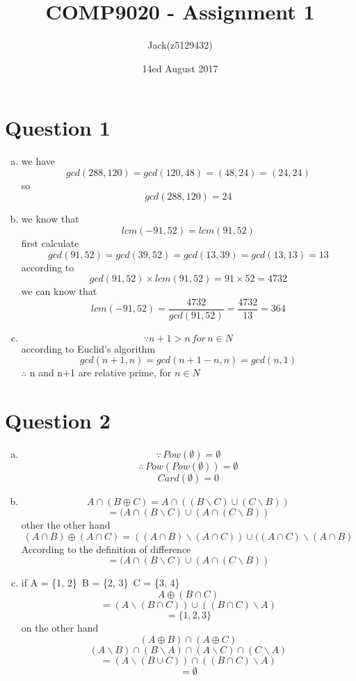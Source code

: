 \documentclass[11pt, a4paper]{article}
\begin{document}
\title{COMP9020 - Assignment 1}
\author{Jack(z5129432)}
\date{ 14ed August 2017 }
\maketitle


\section*{Question 1}
\begin{enumerate}[(a)]
	\item
	we have $$gcd(288, 120) = gcd(120, 48) = (48, 24) = (24, 24)$$
	so $$gcd(288, 120) = 24$$
	\item
	we know that $$lcm(-91, 52) = lcm(91, 52)$$
	first calculate $$gcd(91, 52) = gcd(39, 52) = gcd(13, 39) = gcd(13, 13) = 13$$
	according to \cite{lcm} $$gcd(91, 52) \times lcm(91, 52) = 91 \times 52 = 4732$$ 
	we can know that $$lcm(-91, 52) = \frac{4732}{gcd(91, 52)} = \frac{4732}{13} = 364$$
	\item
	$$ \because n + 1 > n \, for \, n \in N $$
	according to Euclid's algorithm \cite{euclid}
	$$gcd(n +1, n) = gcd (n + 1 - n, n) = gcd(n, 1)$$
	$\therefore$ n and n+1 are relative prime, for $ n \in N$
\end{enumerate}

\section*{Question 2}
\begin{enumerate}[(a)]
	\item 
	$$ \because \, Pow(\emptyset) = \emptyset $$
	$$ \therefore \, Pow(Pow(\emptyset)) = \emptyset$$
	$$ Card( \emptyset) = 0 $$

	\item
	$$ A \cap (B \oplus C) = A \cap ((B \backslash C) \cup (C \backslash B))  $$
	$$ = (A \cap (B \backslash C) \cup (A \cap (C \backslash B)) $$
	other the other hand
	$$ (A \cap B) \oplus (A \cap C) = ((A \cap B) \backslash (A \cap C)) \cup ((A \cap C) \backslash (A \cap B)$$
	According to the definition of difference
	$$ = (A \cap (B \backslash C) \cup (A \cap (C \backslash B)) $$

	\item
	if  A = \{1, 2\}\, B = \{2, 3\}\, C = \{3, 4\}
	$$ A \oplus (B \cap C)$$
	$$ = (A \backslash (B \cap C)) \cup ((B \cap C) \backslash A) $$
	$$ = \{1, 2, 3\}$$
	on the other hand 
	$$ (A \oplus B) \cap (A \oplus C)$$
	$$ (A \backslash B) \cap (B \backslash A) \cap (A \backslash C) \cap (C \backslash A)$$
	$$ = (A \backslash (B \cup C)) \cap ((B \cap C) \backslash A)$$
	$$ = \emptyset $$
	
\end{enumerate}
\end{document}
